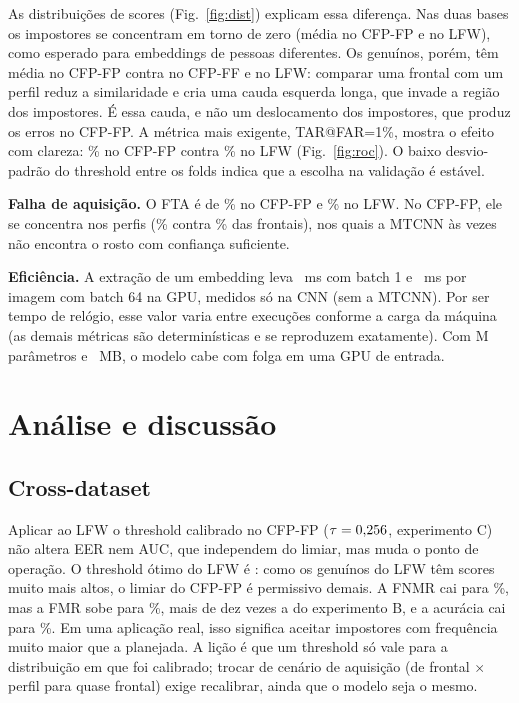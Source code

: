 \documentclass[conference,a4paper]{IEEEtran}
\begin{document}
As distribuições de scores (Fig.~\ref{fig:dist}) explicam essa diferença. Nas duas
bases os impostores se concentram em torno de zero (média \muImpCFP{} no CFP-FP e
\muImpLFW{} no LFW), como esperado para embeddings de pessoas diferentes. Os genuínos,
porém, têm média \muGenCFP{} no CFP-FP contra \muGenFF{} no CFP-FF e \muGenLFW{} no
LFW: comparar uma
frontal com um perfil reduz a similaridade e cria uma cauda esquerda longa, que
invade a região dos impostores. É essa cauda, e não um deslocamento dos impostores,
que produz os erros no CFP-FP. A métrica mais exigente, TAR@FAR=1\%, mostra o
efeito com clareza: \tarCFP\% no CFP-FP contra \tarLFW\% no LFW
(Fig.~\ref{fig:roc}). O baixo desvio-padrão do threshold entre os folds indica que a
escolha na validação é estável.

\textbf{Falha de aquisição.} O FTA é de \ftaCFP\% no CFP-FP e \ftaLFW\% no LFW. No
CFP-FP, ele se concentra nos perfis (\ftaPerfil\% contra \ftaFrontal\% das
frontais), nos quais a MTCNN às vezes não encontra o rosto com confiança suficiente.

\textbf{Eficiência.} A extração de um embedding leva \msBatchOne~ms com batch 1 e
\msBatch~ms por imagem com batch 64 na GPU, medidos só na CNN (sem a MTCNN). Por
ser tempo de relógio, esse valor varia entre execuções conforme a carga da máquina
(as demais métricas são determinísticas e se reproduzem exatamente). Com
\paramsM{}M parâmetros e \pesoMB~MB, o modelo cabe com folga em uma GPU de entrada.

\section{Análise e discussão}
\subsection{Cross-dataset}
Aplicar ao LFW o threshold calibrado no CFP-FP ($\tau=0{,}256$, experimento C) não
altera EER nem AUC, que independem do limiar, mas muda o ponto de operação. O
threshold ótimo do LFW é \thrLFW: como os genuínos do LFW têm scores muito mais
altos, o limiar do CFP-FP é permissivo demais. A FNMR cai para \fnmrCross\%, mas a
FMR sobe para \fmrCross\%, mais de dez vezes a do experimento B, e a acurácia cai
para \accCross\%. Em uma aplicação real, isso significa aceitar impostores com
frequência muito maior que a planejada. A lição é que um threshold só vale para a
distribuição em que foi calibrado; trocar de cenário de aquisição (de frontal
$\times$ perfil para quase frontal) exige recalibrar, ainda que o modelo seja o mesmo.
\end{document}
